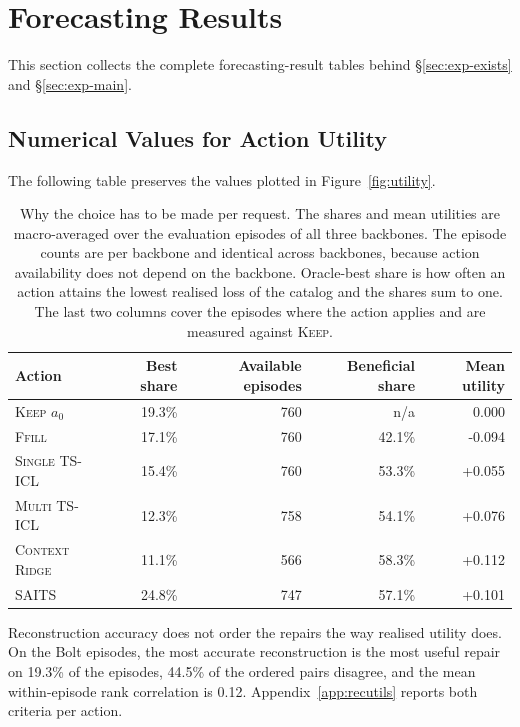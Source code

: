 \documentclass{article}
\begin{document}
\section{Forecasting Results}
\label{app:full-results}

This section collects the complete forecasting-result tables behind \S\ref{sec:exp-exists}
and \S\ref{sec:exp-main}.

\subsection{Numerical Values for Action Utility}
\label{app:main-values}
The following table preserves the values plotted in Figure~\ref{fig:utility}.

\begin{table}[t]
  \caption{Why the choice has to be made per request. The shares and mean utilities are
  macro-averaged over the evaluation episodes of all three backbones. The episode counts are
  per backbone and identical across backbones, because action availability does not depend on
  the backbone. Oracle-best share is how often an action attains the lowest realised loss of the
  catalog and the shares sum to one. The last two columns cover the episodes where the action
  applies and are measured against \textsc{Keep}.}
  \label{tab:heterogeneity}
  \centering
  \small
  \setlength{\tabcolsep}{4pt}
\begin{tabular*}{\textwidth}{@{\extracolsep{\fill}}lrrrr@{}}
    \toprule
    Action & Best share & Available episodes & Beneficial share & Mean utility \\
    \midrule
    \textsc{Keep} $a_0$ & 19.3\% & 760 & n/a & 0.000 \\
    \textsc{Ffill} & 17.1\% & 760 & 42.1\% & -0.094 \\
    \textsc{Single TS-ICL} & 15.4\% & 760 & 53.3\% & +0.055 \\
    \textsc{Multi TS-ICL} & 12.3\% & 758 & 54.1\% & +0.076 \\
    \textsc{Context Ridge} & 11.1\% & 566 & 58.3\% & +0.112 \\
    \textsc{SAITS} & 24.8\% & 747 & 57.1\% & +0.101 \\
    \bottomrule
  \end{tabular*}
  \vspace{-2pt}
  {\footnotesize Reconstruction accuracy does not order the repairs the way realised utility
  does. On the Bolt episodes, the most accurate reconstruction is the most useful repair on
  19.3\% of the
  episodes, 44.5\% of the ordered pairs disagree, and the mean within-episode
  rank correlation is 0.12. Appendix~\ref{app:recutils} reports both criteria per
  action.}
\end{table}
\end{document}
